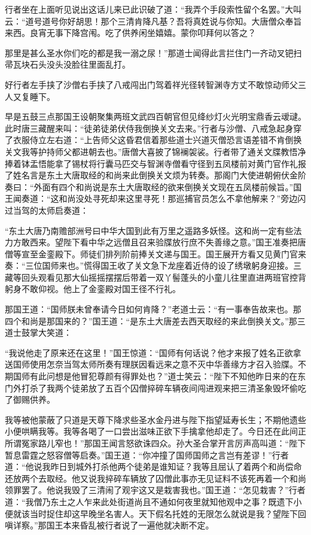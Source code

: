 \documentclass[12pt,UTF8]{ctexbook}
\begin{document}
行者坐在上面听见说出这话儿来已此识破了道：“我弄个手段索性留个名罢。”大叫云：“道号道号你好胡思！那个三清肯降凡基？吾将真姓说与你知。大唐僧众奉旨来西。良宵无事下降宫闱。吃了供养闲坐嬉嬉。蒙你叩拜何以答之？

那里是甚么圣水你们吃的都是我一溺之尿！”那道士闻得此言拦住门一齐动叉钯扫帚瓦块石头没头没脸往里面乱打。

好行者左手挟了沙僧右手挟了八戒闯出门驾着祥光径转智渊寺方丈不敢惊动师父三人又复睡下。

早是五鼓三点那国王设朝聚集两班文武四百朝官但见绛纱灯火光明宝鼎香云叆叇。此时唐三藏醒来叫：“徒弟徒弟伏侍我倒换关文去来。”行者与沙僧、八戒急起身穿了衣服侍立左右道：“上告师父这昏君信着那些道士兴道灭僧恐言语差错不肯倒换关文我等护持师父都进朝去也。”唐僧大喜披了锦襕袈裟。行者带了通关文牒教悟净捧着钵盂悟能拿了锡杖将行囊马匹交与智渊寺僧看守径到五凤楼前对黄门官作礼报了姓名言是东土大唐取经的和尚来此倒换关文烦为转奏。那阁门大使进朝俯伏金阶奏曰：“外面有四个和尚说是东土大唐取经的欲来倒换关文现在五凤楼前候旨。”国王闻奏道：“这和尚没处寻死却来这里寻死！那巡捕官员怎么不拿他解来？”旁边闪过当驾的太师启奏道：

“东土大唐乃南赡部洲号曰中华大国到此有万里之遥路多妖怪。这和尚一定有些法力方敢西来。望陛下看中华之远僧且召来验牒放行庶不失善缘之意。”国王准奏把唐僧等宣至金銮殿下。师徒们排列阶前捧关文递与国王。国王展开方看又见黄门官来奏：“三位国师来也。”慌得国王收了关文急下龙座着近侍的设了绣墩躬身迎接。三藏等回头观看见那大仙摇摇摆摆后带着一双丫髻蓬头的小童儿往里直进两班官控背躬身不敢仰视。他上了金銮殿对国王径不行礼。

那国王道：“国师朕未曾奉请今日如何肯降？”老道士云：“有一事奉告故来也。那四个和尚是那国来的？”国王道：“是东土大唐差去西天取经的来此倒换关文。”那三道士鼓掌大笑道：

“我说他走了原来还在这里！”国王惊道：“国师有何话说？他才来报了姓名正欲拿送国师使用怎奈当驾太师所奏有理朕因看远来之意不灭中华善缘方才召入验牒。不期国师有此问想是他冒犯尊颜有得罪处也？”道士笑云：“陛下不知他昨日来的在东门外打杀了我两个徒弟放了五百个囚僧捽碎车辆夜间闯进观来把三清圣象毁坏偷吃了御赐供养。

我等被他蒙蔽了只道是天尊下降求些圣水金丹进与陛下指望延寿长生；不期他遗些小便哄瞒我等。我等各喝了一口尝出滋味正欲下手擒拿他却走了。今日还在此间正所谓冤家路儿窄也！”那国王闻言怒欲诛四众。孙大圣合掌开言厉声高叫道：“陛下暂息雷霆之怒容僧等启奏。”国王道：“你冲撞了国师国师之言岂有差谬！”行者道：“他说我昨日到城外打杀他两个徒弟是谁知证？我等且屈认了着两个和尚偿命还放两个去取经。他又说我捽碎车辆放了囚僧此事亦无见证料不该死再着一个和尚领罪罢了。他说我毁了三清闹了观宇这又是栽害我也。”国王道：“怎见栽害？”行者道：“我僧乃东土之人乍来此处街道尚且不通如何夜里就知他观中之事？既遗下小便就该当时捉住却这早晚坐名害人。天下假名托姓的无限怎么就说是我？望陛下回嗔详察。”那国王本来昏乱被行者说了一遍他就决断不定。
\end{document}
